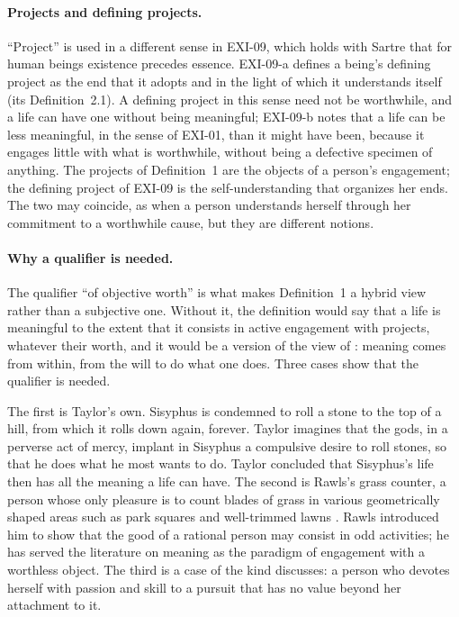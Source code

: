 \paragraph{Projects and defining projects.} \enquote{Project} is used in a different sense in EXI-09, which holds with Sartre that for human beings existence precedes essence. EXI-09-a defines a being's defining project as the end that it adopts and in the light of which it understands itself (its Definition~2.1). A defining project in this sense need not be worthwhile, and a life can have one without being meaningful; EXI-09-b notes that a life can be less meaningful, in the sense of EXI-01, than it might have been, because it engages little with what is worthwhile, without being a defective specimen of anything. The projects of Definition~1 are the objects of a person's engagement; the defining project of EXI-09 is the self-understanding that organizes her ends. The two may coincide, as when a person understands herself through her commitment to a worthwhile cause, but they are different notions.


\paragraph{Why a qualifier is needed.} The qualifier \enquote{of objective worth} is what makes Definition~1 a hybrid view rather than a subjective one. Without it, the definition would say that a life is meaningful to the extent that it consists in active engagement with projects, whatever their worth, and it would be a version of the view of \citet{Taylor1970}: meaning comes from within, from the will to do what one does. Three cases show that the qualifier is needed.

The first is Taylor's own. Sisyphus is condemned to roll a stone to the top of a hill, from which it rolls down again, forever. Taylor imagines that the gods, in a perverse act of mercy, implant in Sisyphus a compulsive desire to roll stones, so that he does what he most wants to do. Taylor concluded that Sisyphus's life then has all the meaning a life can have. The second is Rawls's grass counter, a person whose only pleasure is to count blades of grass in various geometrically shaped areas such as park squares and well-trimmed lawns \citep[\S65]{Rawls1971}. Rawls introduced him to show that the good of a rational person may consist in odd activities; he has served the literature on meaning as the paradigm of engagement with a worthless object. The third is a case of the kind \citet{Wolf2010} discusses: a person who devotes herself with passion and skill to a pursuit that has no value beyond her attachment to it.

